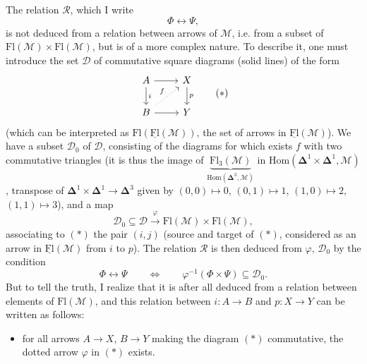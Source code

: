 \documentclass[11pt]{article}
\newcommand{\printedpage}[1]{\marginpar{\footnotesize p.~#1}}
\newcommand{\msp}[1]{\marginpar{\footnotesize [#1]}}
\newcommand{\Fl}{\mathrm{Fl}}
\begin{document}
\begin{itemize}[leftmargin=2.5em]
The relation $\mathcal{R}$, which I write
\[
\Phi\longleftrightarrow\Psi,
\]
\msp{page 81}is not deduced from a relation between arrows of $\mathcal{M}$, i.e. from a subset of $\Fl(\mathcal{M})\times\Fl(\mathcal{M})$, but is of a more complex nature. To describe it, one must introduce the set $\mathcal{D}$ of commutative square diagrams (solid lines) of the form
\[
\begin{tikzcd}
A \arrow[r] \arrow[d, "i"] & X \arrow[d, "p"] \\
B \arrow[r] \arrow[ur, dotted, "f"] & Y
\end{tikzcd}
\tag*{$(*)$}
\]
\printedpage{50}
(which can be interpreted as $\Fl(\underline{\Fl}(\mathcal{M}))$, the set of arrows in $\underline{\Fl}(\mathcal{M})$). We have a subset $\mathcal{D}_0$ of $\mathcal{D}$, consisting of the diagrams for which exists $f$ with two commutative triangles (it is thus the image of $\underbrace{\Fl_3(\mathcal{M})}_{\mathrm{Hom}(\boldsymbol{\Delta}^3,\mathcal{M})}$ in $\mathrm{Hom}(\boldsymbol{\Delta}^1\times\boldsymbol{\Delta}^1,\mathcal{M})$, transpose of $\boldsymbol{\Delta}^1\times\boldsymbol{\Delta}^1\longrightarrow\boldsymbol{\Delta}^3$ given by $(0,0)\longmapsto 0$, $(0,1)\longmapsto 1$, $(1,0)\longmapsto 2$, $(1,1)\longmapsto 3$), and a map
\[
\mathcal{D}_0\subseteq\mathcal{D}\xrightarrow{\ \varphi\ }\Fl(\mathcal{M})\times\Fl(\mathcal{M}),
\]
associating to $(*)$ the pair $(i,j)$ (source and target of $(*)$, considered as an arrow in $\underline{\Fl}(\mathcal{M})$ from $i$ to $p$). The relation $\mathcal{R}$ is then deduced from $\varphi$, $\mathcal{D}_0$ by the condition
\msp{page 82}
\[
\Phi\longleftrightarrow\Psi\qquad\Longleftrightarrow\qquad\varphi^{-1}(\Phi\times\Psi)\subseteq\mathcal{D}_0.
\]
But to tell the truth, I realize that it is after all deduced from a relation between elements of $\Fl(\mathcal{M})$, and this relation between $i : A\longrightarrow B$ and $p : X\longrightarrow Y$ can be written as follows:
\begin{itemize}[leftmargin=3em]
\item[$(**)$] for all arrows $A\longrightarrow X$, $B\longrightarrow Y$ making the diagram $(*)$ commutative, the dotted arrow $\varphi$ in $(*)$ exists. %
\end{itemize}
\end{itemize}
\end{document}
